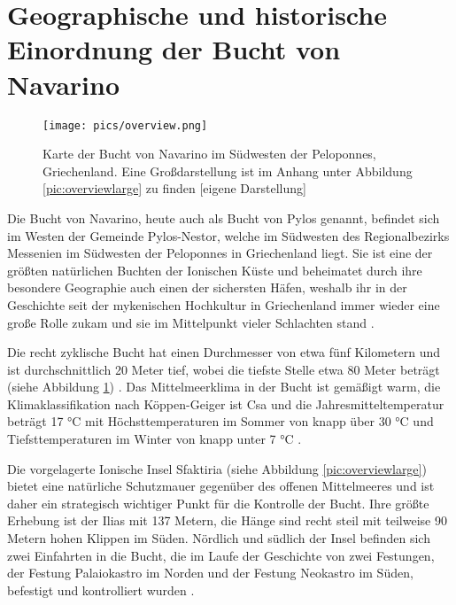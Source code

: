 \documentclass[preprint]{geomorphica} %
\begin{document}
 
\section{Geographische und historische Einordnung der Bucht von Navarino}

\begin{figure}[h]
    \centering
    \texttt{[image: pics/overview.png]}
    \caption{Karte der Bucht von Navarino im Südwesten der Peloponnes, Griechenland. Eine Großdarstellung ist im Anhang unter Abbildung \ref{pic:overviewlarge} zu finden [eigene Darstellung]}
    \label{pic:overviewsmall}
\end{figure}

Die Bucht von Navarino, heute auch als Bucht von Pylos genannt, befindet sich im Westen der Gemeinde Pylos-Nestor, welche im Südwesten des Regionalbezirks Messenien im Südwesten der Peloponnes in Griechenland liegt. 
Sie ist eine der größten natürlichen Buchten der Ionischen Küste und beheimatet durch ihre besondere Geographie auch einen der sichersten Häfen, weshalb ihr in der Geschichte seit der mykenischen Hochkultur in Griechenland immer wieder eine große Rolle zukam und sie im Mittelpunkt vieler Schlachten stand \cite{Davis2008}.

Die recht zyklische Bucht hat einen Durchmesser von etwa fünf Kilometern und ist durchschnittlich 20 Meter tief, wobei die tiefste Stelle etwa 80 Meter beträgt (siehe Abbildung \ref{pic:overviewsmall}) \cite{James1837}.
Das Mittelmeerklima in der Bucht ist gemäßigt warm, die Klimaklassifikation nach Köppen-Geiger ist Csa und die Jahresmitteltemperatur beträgt 17 °C mit Höchsttemperaturen im Sommer von knapp über 30 °C und Tiefsttemperaturen im Winter von knapp unter 7 °C \cite{ClimateData2023}.

Die vorgelagerte Ionische Insel Sfaktiria (siehe Abbildung \ref{pic:overviewlarge}) bietet eine natürliche Schutzmauer gegenüber des offenen Mittelmeeres und ist daher ein strategisch wichtiger Punkt für die Kontrolle der Bucht.
Ihre größte Erhebung ist der Ilias mit 137 Metern, die Hänge sind recht steil mit teilweise 90 Metern hohen Klippen im Süden.
Nördlich und südlich der Insel befinden sich zwei Einfahrten in die Bucht, die im Laufe der Geschichte von zwei Festungen, der Festung Palaiokastro im Norden und der Festung Neokastro im Süden, befestigt und kontrolliert wurden \cite{Bon1969}.
\end{document}
